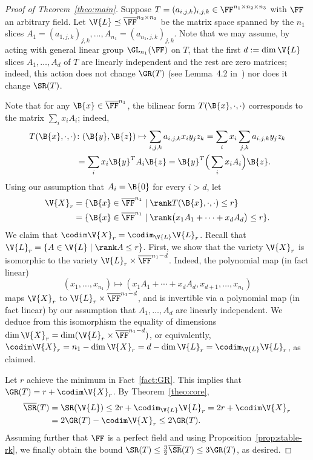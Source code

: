 \begin{proof}[Proof of Theorem~\ref{theo:main}]
Suppose $T=(a_{i,j,k})_{i,j,k} \in \FF^{n_1 \times n_2 \times n_3}$ with $\FF$ an arbitrary field.
Let $\V{L} \preceq \overline{\FF}^{n_2\times n_3}$ be the matrix space spanned by the $n_1$ slices $A_1=(a_{1,j,k})_{j,k},\ldots,A_{n_1}=(a_{n_1,j,k})_{j,k}$. 
Note that we may assume, by acting with general linear group $\GL_{n_1}(\FF)$ on $T$, that the first $d:=\dim\V{L}$ slices $A_1,\ldots,A_{d}$ of $T$ are linearly independent and the rest are zero matrices; indeed, this action does not change $\GR(T)$ (see Lemma~4.2 in~\cite{KoppartyMoZu20}) nor does it change $\SR(T)$.

Note that for any $\B{x} \in \overline{\FF}^{n_1}$, the bilinear form $T(\B{x},\cdot,\cdot)$ corresponds to the matrix $\sum_i x_iA_i$;
indeed, 
\begin{align*}
	T(\B{x},\cdot,\cdot) &\colon (\B{y},\B{z}) \mapsto \sum_{i,j,k} a_{i,j,k}x_iy_jz_k = \sum_i x_i \sum_{j,k} a_{i,j,k}y_jz_k \\
	&= \sum_i x_i \B{y}^TA_i\B{z} = \B{y}^T\Big(\sum_i x_iA_i\Big)\B{z}.
\end{align*}
Using our assumption that $A_i = \B{0}$ for every $i>d$, 
let 
\begin{align*}
	\V{X}_r &= \{\B{x} \in \overline{\FF}^{n_1} \mid \rank T(\B{x},\cdot,\cdot) \le r\}\\ 
	&= \{\B{x} \in \overline{\FF}^{n_1} \mid \rank\big(x_1A_1+\cdots+x_dA_d\big) \le r\}.
\end{align*}
We claim that $\codim\V{X}_r=\codim_\V{L} \V{L}_r$. 
Recall that $\V{L}_r = \{ A \in \V{L} \mid \rank A \le r\}$. 
First, we show that the variety $\V{X}_r$ is isomorphic to the variety $\V{L}_r \times \overline{\FF}^{n_1-d}$. 
Indeed, the polynomial map (in fact linear) 
$$(x_1,\ldots,x_{n_1}) \mapsto (x_1A_1+\cdots+x_dA_d,x_{d+1},\ldots,x_{n_1})$$ 
maps $\V{X}_r$ to $\V{L}_r\times \overline{\FF}^{n_1-d}$, and is invertible via a polynomial map (in fact linear) by our assumption that $A_1,\ldots,A_{d}$ are linearly independent.
We deduce from this isomorphism the equality of dimensions $\dim\V{X}_r = \dim(\V{L}_r\times \overline{\FF}^{n_1-d})$, 
or equivalently, $\codim\V{X}_r = n_1-\dim\V{X}_r = d-\dim\V{L}_r = \codim_\V{L} \V{L}_r$, as claimed.


Let $r$ achieve the minimum in Fact~\ref{fact:GR}. This implies that
$\GR(T) = r + \codim \V{X}_r$. 
By Theorem~\ref{theo:core},
\begin{align*}
	\overline{\SR}(T) &= \SR(\V{L}) \le 2r + \codim_\V{L} \V{L}_r
	= 2r + \codim \V{X}_r\\
	&= 2\GR(T) - \codim \V{X}_r 
	\le 2\GR(T).
\end{align*}
Assuming further that $\FF$ is a perfect field and using Proposition~\ref{prop:stable-rk}, 
we finally obtain the bound
$\SR(T) \le \frac32\overline{\SR}(T) \le 3\GR(T)$, 
as desired.
\end{proof}




